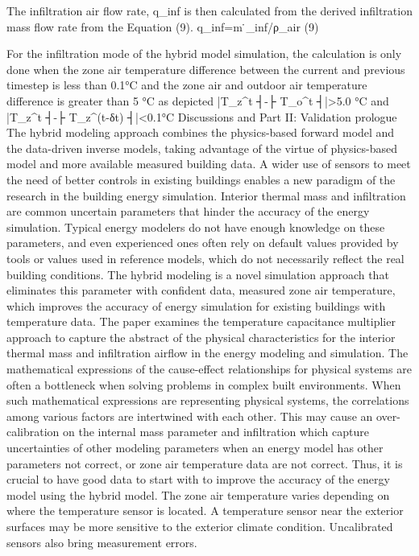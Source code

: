 The infiltration air flow rate, q_inf is then calculated from the derived infiltration mass flow rate from the Equation (9).
q_inf=m ̇_inf/ρ_air 
	(9)

For the infiltration mode of the hybrid model simulation, the calculation is only done when the zone air temperature difference between the current and previous timestep is less than 0.1°C and the zone air and outdoor air temperature difference is greater than 5 °C as depicted |T_z^t ┤-├ T_o^t ┤|>5.0 °C and |T_z^t ┤-├ T_z^(t-δt) ┤|<0.1°C
Discussions and Part II: Validation prologue
The hybrid modeling approach combines the physics-based forward model and the data-driven inverse models, taking advantage of the virtue of physics-based model and more available measured building data. A wider use of sensors to meet the need of better controls in existing buildings enables a new paradigm of the research in the building energy simulation. Interior thermal mass and infiltration are common uncertain parameters that hinder the accuracy of the energy simulation. Typical energy modelers do not have enough knowledge on these parameters, and even experienced ones often rely on default values provided by tools or values used in reference models, which do not necessarily reflect the real building conditions. The hybrid modeling is a novel simulation approach that eliminates this parameter with confident data, measured zone air temperature, which improves the accuracy of energy simulation for existing buildings with temperature data.  
The paper examines the temperature capacitance multiplier approach to capture the abstract of the physical characteristics for the interior thermal mass and infiltration airflow in the energy modeling and simulation. The mathematical expressions of the cause-effect relationships for physical systems are often a bottleneck when solving problems in complex built environments. When such mathematical expressions are representing physical systems, the correlations among various factors are intertwined with each other. This may cause an over-calibration on the internal mass parameter and infiltration which capture uncertainties of other modeling parameters when an energy model has other parameters not correct, or zone air temperature data are not correct. Thus, it is crucial to have good data to start with to improve the accuracy of the energy model using the hybrid model. The zone air temperature varies depending on where the temperature sensor is located. A temperature sensor near the exterior surfaces may be more sensitive to the exterior climate condition. Uncalibrated sensors also bring measurement errors.
